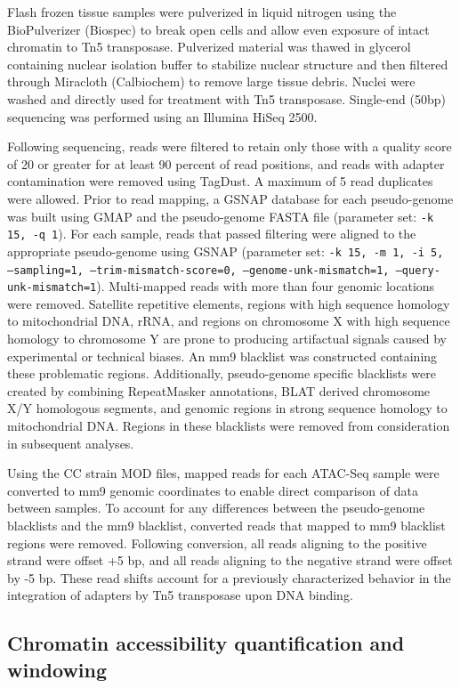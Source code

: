 Flash frozen tissue samples were pulverized in liquid nitrogen using the BioPulverizer (Biospec) to break open cells and allow even exposure of intact chromatin to Tn5 transposase. Pulverized material was thawed in glycerol containing nuclear isolation buffer to stabilize nuclear structure and then filtered through Miracloth (Calbiochem) to remove large tissue debris. Nuclei were washed and directly used for treatment with Tn5 transposase. Single-end (50bp) sequencing was performed using an Illumina HiSeq 2500.

Following sequencing, reads were filtered to retain only those with a quality score of 20 or greater for at least 90 percent of read positions, and reads with adapter contamination were removed using TagDust. A maximum of 5 read duplicates were allowed. Prior to read mapping, a GSNAP database for each pseudo-genome was built using GMAP and the pseudo-genome FASTA file (parameter set: \texttt{-k 15, -q 1}). For each sample, reads that passed filtering were aligned to the appropriate pseudo-genome using GSNAP (parameter set: \texttt{-k 15, -m 1, -i 5, --sampling=1, --trim-mismatch-score=0, --genome-unk-mismatch=1, --query-unk-mismatch=1}). Multi-mapped reads with more than four genomic locations were removed. Satellite repetitive elements, regions with high sequence homology to mitochondrial DNA, rRNA, and regions on chromosome X with high sequence homology to chromosome Y are prone to producing artifactual signals caused by experimental or technical biases. An mm9 blacklist was constructed containing these problematic regions. Additionally, pseudo-genome specific blacklists were created by combining RepeatMasker annotations, BLAT derived chromosome X/Y homologous segments, and genomic regions in strong sequence homology to mitochondrial DNA. Regions in these blacklists were removed from consideration in subsequent analyses.

Using the CC strain MOD files, mapped reads for each ATAC-Seq sample were converted to mm9 genomic coordinates to enable direct comparison of data between samples. To account for any differences between the pseudo-genome blacklists and the mm9 blacklist, converted reads that mapped to mm9 blacklist regions were removed. Following conversion, all reads aligning to the positive strand were offset +5 bp, and all reads aligning to the negative strand were offset by -5 bp. These read shifts account for a previously characterized behavior in the integration of adapters by Tn5 transposase upon DNA binding.

\subsection{Chromatin accessibility quantification and windowing}

